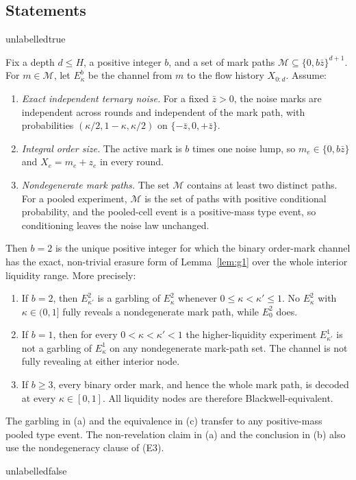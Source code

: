 \subsection*{Statements}
\label{sec:pf-garbling-statements}

\csname unlabelledtrue\endcsname
\begin{proposition}
\label{prop:trichotomy}
Fix a depth $d\leq H$, a positive integer $b$, and a set of mark paths
$\mathcal M\subseteq\{0,b\bar z\}^{d+1}$. For $m\in\mathcal M$, let
$E^b_\kappa$ be the channel from $m$ to the flow history $X_{0:d}$. Assume:
\begin{enumerate}[label=(E\arabic*),leftmargin=3.0em,itemsep=3pt]
\item \emph{Exact independent ternary noise.} For a fixed $\bar z>0$, the noise marks are
  independent across rounds and independent of the mark path, with probabilities
  $(\kappa/2,1-\kappa,\kappa/2)$ on $\{-\bar z,0,+\bar z\}$.
\item \emph{Integral order size.} The active mark is $b$ times one noise lump, so
  $m_e\in\{0,b\bar z\}$ and $X_e=m_e+z_e$ in every round.
\item \emph{Nondegenerate mark paths.} The set $\mathcal M$ contains at least two distinct paths.
  For a pooled experiment, $\mathcal M$ is the set of paths with positive conditional probability,
  and the pooled-cell event is a positive-mass type event, so conditioning leaves the noise law
  unchanged.
\end{enumerate}
Then $b = 2$ is the unique positive integer for which the binary order-mark channel has the exact,
non-trivial erasure form of Lemma~\ref{lem:g1} over the whole interior liquidity range. More precisely:
\begin{enumerate}[label=(\alph*),leftmargin=2.4em,itemsep=3pt]
\item If $b = 2$, then $E^2_{\kappa'}$ is a garbling of $E^2_\kappa$ whenever
  $0\leq\kappa<\kappa'\leq1$. No $E^2_\kappa$ with $\kappa\in(0,1]$ fully reveals a
  nondegenerate mark path, while $E^2_0$ does.
\item If $b = 1$, then for every $0<\kappa<\kappa'<1$ the higher-liquidity experiment
  $E^1_{\kappa'}$ is not a garbling of $E^1_\kappa$ on any nondegenerate mark-path set.
  The channel is not fully revealing at either interior node.
\item If $b \geq 3$, every binary order mark, and hence the whole mark path, is decoded at every
  $\kappa\in[0,1]$. All liquidity nodes are therefore Blackwell-equivalent.
\end{enumerate}
The garbling in (a) and the equivalence in (c) transfer to any positive-mass pooled type event.
The non-revelation claim in (a) and the conclusion in (b) also use the nondegeneracy clause of (E3).
\end{proposition}
\csname unlabelledfalse\endcsname

